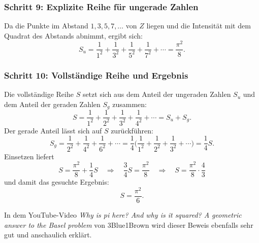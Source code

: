 \subsubsection{Schritt 9: Explizite Reihe für ungerade Zahlen}
Da die Punkte im Abstand $1, 3, 5, 7, \ldots$ von $Z$ liegen und die
Intensität mit dem Quadrat des Abstands abnimmt, ergibt sich:
\[
S_u
=
\frac{1}{1^2} + \frac{1}{3^2} + \frac{1}{5^2} + \frac{1}{7^2} + \cdots
=
\frac{\pi^2}{8}.
\]

\subsubsection{Schritt 10: Vollständige Reihe und Ergebnis}
Die vollständige Reihe $S$ setzt sich aus dem Anteil der ungeraden Zahlen
$S_u$ und dem Anteil der geraden Zahlen $S_g$ zusammen:
\[
S
=
\frac{1}{1^2} + \frac{1}{2^2} + \frac{1}{3^2} + \frac{1}{4^2} + \cdots
=
S_u + S_g.
\]
Der gerade Anteil lässt sich auf $S$ zurückführen:
\[
S_g
=
\frac{1}{2^2} + \frac{1}{4^2} + \frac{1}{6^2} + \cdots
=
\frac{1}{4}
\biggl(
\frac{1}{1^2} + \frac{1}{2^2} + \frac{1}{3^2} + \cdots
\biggr)
=
\frac{1}{4} S.
\]
Einsetzen liefert
\[
S
=
\frac{\pi^2}{8} + \frac{1}{4} S
\quad\Rightarrow\quad
\frac{3}{4} S = \frac{\pi^2}{8}
\quad\Rightarrow\quad
S = \frac{\pi^2}{8} \cdot \frac{4}{3}
\]
und damit das gesuchte Ergebnis:
\begin{equation*}
S = \frac{\pi^2}{6}.
\end{equation*}

In dem YouTube-Video \textit{Why is pi here? And why is it squared? A geometric answer 
to the Basel problem} von 3Blue1Brown \cite{Basel:YouTube2} wird dieser Beweis ebenfalls 
sehr gut und anschaulich erklärt.
